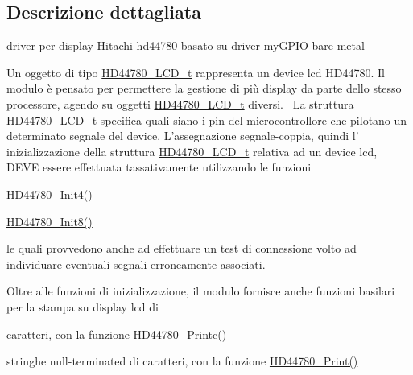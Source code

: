 \subsection{Descrizione dettagliata}
driver per display Hitachi hd44780 basato su driver my\+G\+P\+I\+O bare-\/metal 

Un oggetto di tipo \hyperlink{struct_h_d44780___l_c_d__t}{H\+D44780\+\_\+\+L\+C\+D\+\_\+t} rappresenta un device lcd H\+D44780. Il modulo è pensato per permettere la gestione di più display da parte dello stesso processore, agendo su oggetti \hyperlink{struct_h_d44780___l_c_d__t}{H\+D44780\+\_\+\+L\+C\+D\+\_\+t} diversi.~\newline
 La struttura \hyperlink{struct_h_d44780___l_c_d__t}{H\+D44780\+\_\+\+L\+C\+D\+\_\+t} specifica quali siano i pin del microcontrollore che pilotano un determinato segnale del device. L'assegnazione segnale-\/coppia, quindi l' inizializzazione della struttura \hyperlink{struct_h_d44780___l_c_d__t}{H\+D44780\+\_\+\+L\+C\+D\+\_\+t} relativa ad un device lcd, D\+E\+V\+E essere effettuata tassativamente utilizzando le funzioni~\newline

\begin{DoxyItemize}
\item \hyperlink{group___h_d44780_ga0c08f9e41d770ebfa4af385a56b47b81}{H\+D44780\+\_\+\+Init4()}
\item \hyperlink{group___h_d44780_gad212907e20316f4fc0e93d7c7a8f338e}{H\+D44780\+\_\+\+Init8()}~\newline

\end{DoxyItemize}

le quali provvedono anche ad effettuare un test di connessione volto ad individuare eventuali segnali erroneamente associati.~\newline


Oltre alle funzioni di inizializzazione, il modulo fornisce anche funzioni basilari per la stampa su display lcd di
\begin{DoxyItemize}
\item caratteri, con la funzione \hyperlink{group___h_d44780_ga57b8c6ca0b3c12e5f7273b3c373a6f17}{H\+D44780\+\_\+\+Printc()}
\item stringhe null-\/terminated di caratteri, con la funzione \hyperlink{group___h_d44780_ga3aedff8e2040e62db569fde955d3987b}{H\+D44780\+\_\+\+Print()}~\newline

\end{DoxyItemize}

